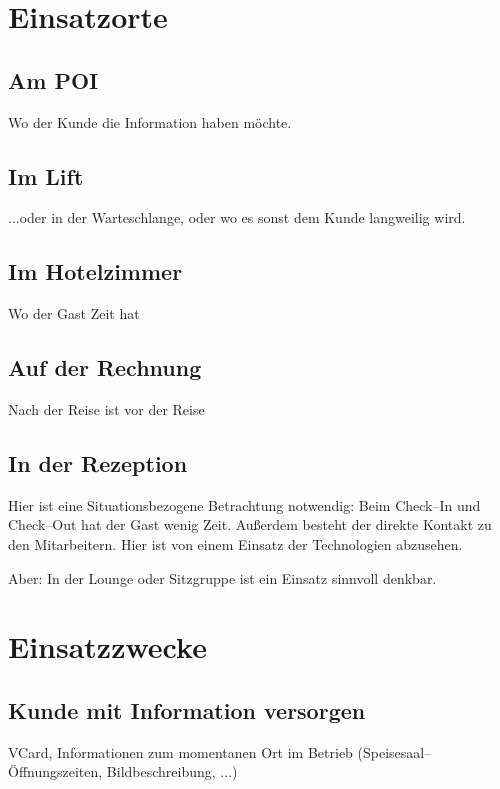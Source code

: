 \section{Einsatzorte} %
\label{sec:einsatzorte}

\subsection{Am POI} %
\label{sub:am_poi}
Wo der Kunde die Information haben möchte.

\subsection{Im Lift} %
\label{sub:im_lift}
...oder in der Warteschlange, oder wo es sonst dem Kunde langweilig wird.

\subsection{Im Hotelzimmer} %
\label{sub:im_hotelzimmer}
Wo der Gast Zeit hat

\subsection{Auf der Rechnung} %
\label{sub:auf_der_rechnung}
Nach der Reise ist vor der Reise

\subsection{In der Rezeption} %
\label{sub:in_der_rezeption}
Hier ist eine Situationsbezogene Betrachtung notwendig: Beim Check--In und Check--Out hat der Gast wenig Zeit. Außerdem besteht der direkte Kontakt zu den Mitarbeitern. Hier ist von einem Einsatz der Technologien abzusehen.

Aber: In der Lounge oder Sitzgruppe ist ein Einsatz sinnvoll denkbar.


\newpage
\section{Einsatzzwecke} %
\label{sec:einsatzzwecke}

\subsection{Kunde mit Information versorgen} %
\label{sub:kunde_mit_information_versorgen}
VCard, Informationen zum momentanen Ort im Betrieb (Speisesaal--Öffnungszeiten, Bildbeschreibung, ...)

